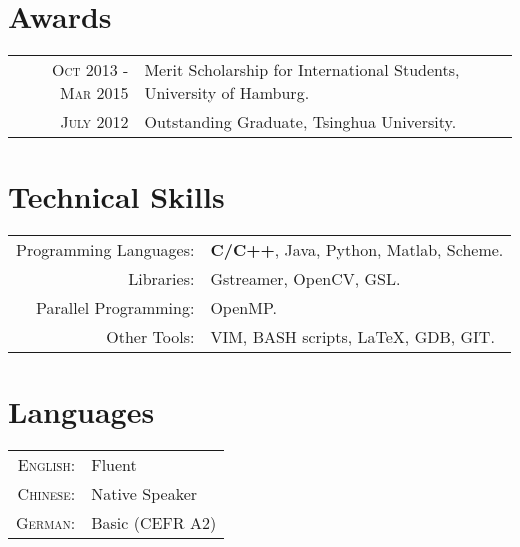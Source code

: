 \documentclass[a4paper,11pt]{article} %
\begin{document}

\section{Awards}

\begin{tabular}{rl}
  \textsc{Oct 2013 - Mar 2015} & Merit Scholarship for International Students, {\small University of Hamburg}. \\
  \textsc{July 2012} & Outstanding Graduate, {\small Tsinghua University}. \\
\end{tabular}


\section{Technical Skills}

\begin{tabular}{rl}
  Programming Languages: & \textbf{C/C++}, Java, Python, Matlab, Scheme. \\
  Libraries: & Gstreamer, OpenCV, GSL. \\
  Parallel Programming: & OpenMP. \\
  Other Tools: & VIM, BASH scripts, \LaTeX, GDB, GIT. \\
\end{tabular}


\section{Languages}

\begin{tabular}{rl}
  \textsc{English:} & Fluent \\
  \textsc{Chinese:} & Native Speaker \\
  \textsc{German:} & Basic (CEFR A2) \\
\end{tabular}



\end{document}
